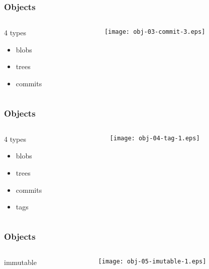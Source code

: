\documentclass[english]{beamer}
\begin{document}
\begin{frame}
\frametitle{Objects}
\begin{columns}[t]
        \begin{column}[T]{.5\textwidth}
                4 types
                \begin{itemize}
                        \item blobs
                        \item trees
                        \item commits
                \end{itemize}
        \end{column}
        \begin{column}[T]{.5\textwidth}
                \texttt{[image: obj-03-commit-3.eps]}
        \end{column}
\end{columns}
\end{frame}

\begin{frame}
\frametitle{Objects}
\begin{columns}[t]
        \begin{column}[T]{.5\textwidth}
                4 types
                \begin{itemize}
                        \item blobs
                        \item trees
                        \item commits
                        \item tags
                \end{itemize}
        \end{column}
        \begin{column}[T]{.5\textwidth}
                \texttt{[image: obj-04-tag-1.eps]}
        \end{column}
\end{columns}
\end{frame}

\begin{frame}
\frametitle{Objects}
\begin{columns}[t]
        \begin{column}[T]{.5\textwidth}
                immutable
        \end{column}
        \begin{column}[T]{.5\textwidth}
                \texttt{[image: obj-05-imutable-1.eps]}
        \end{column}
\end{columns}
\end{frame}
\end{document}
